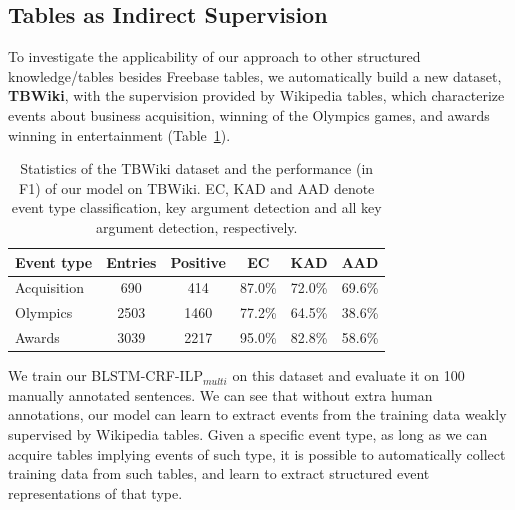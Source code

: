 \subsection{Tables as Indirect Supervision}
To investigate the applicability of our approach to other structured knowledge/tables besides Freebase \CVT tables, we automatically build
a new dataset, \textbf{TBWiki}, with the supervision provided by Wikipedia tables, which characterize events about business acquisition,
winning of the Olympics games, and awards winning in entertainment (Table~\ref{tab:6}).

\begin{table}[t]
\scriptsize
\centering
\begin{tabular}{lccccc}
    \toprule
	\textbf{Event type} & \textbf{Entries} & \textbf{Positive} & \textbf{EC} & \textbf{KAD} & \textbf{AAD} \\
    \midrule
	\rowcolor{Gray} Acquisition & 690 & 414 & 87.0\% & 72.0\% & 69.6\% \\
	Olympics & 2503 & 1460 & 77.2\% & 64.5\% & 38.6\% \\
	\rowcolor{Gray} Awards & 3039 & 2217 & 95.0\% & 82.8\% & 58.6\% \\
    \bottomrule
\end{tabular}
\caption{Statistics of the TBWiki dataset and the performance (in F1) of our model on TBWiki.
EC, KAD and AAD denote event type classification, key argument detection and all key argument detection, respectively.
\label{tab:6}}
\end{table}

We train our BLSTM-CRF-ILP$_{multi}$ on this dataset and evaluate it on 100 manually annotated sentences.
We can see that without extra human annotations, %
our model can learn to extract events from the training data weakly supervised by Wikipedia tables. Given a specific event type, as long as we can acquire tables implying events of such type, it is possible to automatically collect training data from such tables, and learn to extract structured event representations of that type. %
